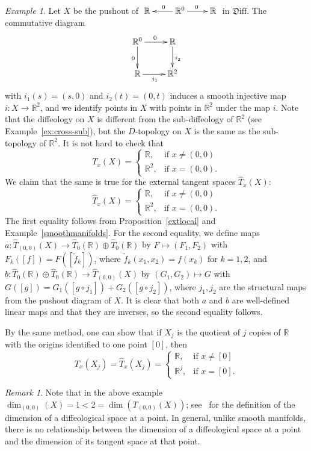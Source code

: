 \documentclass{amsart}
\theoremstyle{remark}
\newtheorem{rem}[de]{Remark}
\newtheorem{ex}[de]{Example}
\newcommand{\ra}{\to}
\newcommand{\Diff}{{\mathfrak{D}\mathrm{iff}}}
\def \R{\mathbb{R}}
\begin{document}
\begin{ex}\label{ex:cross-pushout}
Let $X$ be the pushout of $\xymatrix{\R & \R^0 \ar[l]_0 \ar[r]^0 & \R}$ in $\Diff$.
The commutative diagram
\[
\xymatrix{\R^0 \ar[r]^0 \ar[d]_0 & \R \ar[d]^{i_2} \\ \R \ar[r]_{i_1} & \R^2}
\]
with $i_1(s)=(s,0)$ and $i_2(t)=(0,t)$ induces a smooth injective map $i:X \ra \R^2$,
and we identify points in $X$ with points in $\R^2$ under the map $i$.
Note that the diffeology on $X$ is different from the sub-diffeology of $\R^2$
(see Example~\ref{ex:cross-sub}),
but the $D$-topology on $X$ is the same as the sub-topology of $\R^2$.
It is not hard to check that
\[
T_x(X) = \begin{cases}\R,   & \text{if $x \neq (0,0)$} \\
                      \R^2, & \text{if $x=(0,0)$.}
         \end{cases}
\]
We claim that the same is true for the external tangent spaces $\hat{T}_x(X)$:
\[
\hat{T}_x(X) = \begin{cases} \R,   & \text{if $x \neq (0,0)$} \\
                             \R^2, & \text{if $x=(0,0)$.}
               \end{cases}
\]
The first equality follows from
Proposition~\ref{extlocal} and Example~\ref{smoothmanifolds}.
For the second equality, we define maps
$a:\hat{T}_{(0,0)}(X) \ra \hat{T}_0(\R) \oplus \hat{T}_0(\R)$ by
$F \mapsto (F_1,F_2)$ with $F_k([f])=F([\tilde{f}_k])$,
where $\tilde{f}_k(x_1,x_2)=f(x_k)$ for $k=1,2$,
and $b:\hat{T}_0(\R) \oplus \hat{T}_0(\R) \ra \hat{T}_{(0,0)}(X)$ by
$(G_1,G_2) \mapsto G$ with $G([g])=G_1([g \circ j_1])+G_2([g \circ j_2])$,
where $j_1,j_2$ are the structural maps from the pushout diagram of $X$.
It is clear that both $a$ and $b$ are well-defined linear maps and
that they are inverses, so the second equality follows.

By the same method, one can show that if $X_j$ is the quotient of $j$ copies of $\R$
with the origins identified to one point $[0]$, then
\[
T_x(X_j)=\hat{T}_x(X_j)=\begin{cases} \R, & \textrm{if $x \neq [0]$} \\ \R^j, & \textrm{if $x=[0]$.} \end{cases}
\]
\end{ex}

\begin{rem}\label{re:cross-pushout}
Note that in the above example $\dim_{(0,0)}(X)=1<2=\dim(T_{(0,0)}(X))$;
see~\cite{I2} for the definition of the dimension of a diffeological space at a point.
In general, unlike smooth manifolds, there is no relationship between the dimension of a diffeological space
at a point and the dimension of its tangent space at that point.
\end{rem}
\end{document}

